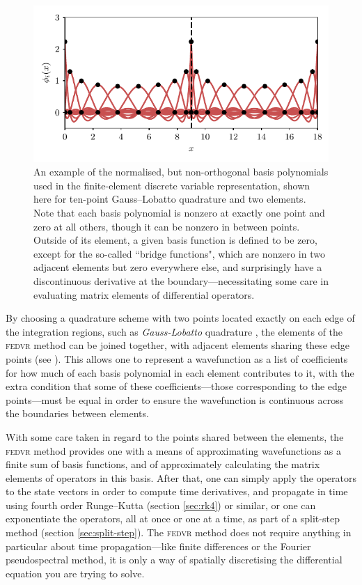 \begin{figure}[t]
    \centerfloat
    \includegraphics{figures/numerics/fedvr_basis.pdf}
    \caption{An example of the normalised, but non-orthogonal basis polynomials used in the finite-element discrete variable representation, shown here for ten-point Gauss--Lobatto quadrature and two elements. Note that each basis polynomial is nonzero at exactly one point and zero at all others, though it can be nonzero in between points. Outside of its element, a given basis function is defined to be zero, except for the so-called ``bridge functions", which are nonzero in two adjacent elements but zero everywhere else, and surprisingly have a discontinuous derivative at the boundary---necessitating some care in evaluating matrix elements of differential operators.}
    \label{fig:fedvr_basis}
\end{figure}

By choosing a quadrature scheme with two points located exactly on each edge of the integration regions, such as \emph{Gauss-Lobatto} quadrature \cite{schneider_discrete_2005}, the elements of the \textsc{fedvr} method can be joined together, with adjacent elements sharing these edge points (see ). This allows one to represent a wavefunction as a list of coefficients for how much of each basis polynomial in each element contributes to it, with the extra condition that some of these coefficients---those corresponding to the edge points---must be equal in order to ensure the wavefunction is continuous across the boundaries between elements.

With some care taken in regard to the points shared between the elements, the \textsc{fedvr} method provides one with a means of approximating wavefunctions as a finite sum of basis functions, and of approximately calculating the matrix elements of operators in this basis. After that, one can simply apply the operators to the state vectors in order to compute time derivatives, and propagate in time using fourth order Runge--Kutta (section \ref{sec:rk4}) or similar, or one can exponentiate the operators, all at once or one at a time, as part of a split-step method (section \ref{sec:split-step}). The \textsc{fedvr} method does not require anything in particular about time propagation---like finite differences or the Fourier pseudospectral method, it is only a way of spatially discretising the differential equation you are trying to solve.

